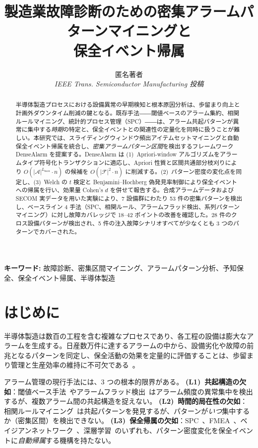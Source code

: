 \documentclass[11pt]{article}
\title{製造業故障診断のための密集アラームパターンマイニングと\\保全イベント帰属}
\author{
  匿名著者\\
  \textit{IEEE Trans. Semiconductor Manufacturing 投稿}
}
\date{}
\begin{document}
\maketitle

\begin{abstract}
半導体製造プロセスにおける設備異常の早期検知と根本原因分析は、歩留まり向上と計画外ダウンタイム削減の鍵となる。既存手法――閾値ベースのアラーム集約、相関ルールマイニング、統計的プロセス管理（SPC）――は、アラーム共起パターンが異常に集中する\emph{時期}の特定と、保全イベントとの関連性の定量化を同時に扱うことが難しい。本研究では、スライディングウィンドウ頻出アイテムセットマイニングと自動保全イベント帰属を統合し、\emph{密集アラームパターン区間}を検出するフレームワーク DenseAlarm を提案する。DenseAlarm は (1)~Apriori-window アルゴリズムをアラームタイプ符号化トランザクションに適応し、Apriori 性質と区間共通部分枝刈りにより $O(|\mathcal{A}|^{L_{\max}} \cdot n)$ の候補を $O(|\mathcal{F}|^2 \cdot n)$ に削減する。(2)~パターン密度の変化点を同定し、(3)~Welch の $t$ 検定と Benjamini--Hochberg 偽発見率制御により保全イベントへの帰属を行い、効果量 Cohen's $d$ を併せて報告する。合成アラームデータおよび SECOM 実データを用いた実験により、7 設備群にわたり 53 件の密集パターンを検出し、ベースライン 4 手法（SPC、相関ルール、アラームフラッド検出、系列パターンマイニング）に対し故障カバレッジで 18--42 ポイントの改善を確認した。28 件のクロス設備パターンが検出され、5 件の注入故障シナリオすべてが少なくとも 3 つのパターンでカバーされた。
\end{abstract}

\noindent\textbf{キーワード:} 故障診断、密集区間マイニング、アラームパターン分析、予知保全、保全イベント帰属、半導体製造

\section{はじめに}\label{sec:intro}

半導体製造は数百の工程を含む複雑なプロセスであり、各工程の設備は膨大なアラームを生成する。日産数万件に達するアラームの中から、設備劣化や故障の前兆となるパターンを同定し、保全活動の効果を定量的に評価することは、歩留まり管理と生産効率の維持に不可欠である~\citep{he2007secom,susto2015machine}。

アラーム管理の現行手法には、3 つの根本的限界がある。
\textbf{(L1)~共起構造の欠如}：閾値ベース手法~\citep{bransby1998alarm,isa2009alarm}やアラームフラッド検出~\citep{izadi2013alarm,wang2016alarm}はアラーム頻度の異常集中を検出するが、複数アラーム間の共起構造を捉えない。
\textbf{(L2)~時間的局在性の欠如}：相関ルールマイニング~\citep{agrawal1994fast,cheng2013alarm}は共起パターンを発見するが、パターンが\emph{いつ}集中するか（密集区間）を検出できない。
\textbf{(L3)~保全帰属の欠如}：SPC~\citep{montgomery2019spc}、FMEA~\citep{stamatis2003fmea}、ベイジアンネットワーク~\citep{weber2012bayesian}、深層学習~\citep{khan2018deep,li2020deep}のいずれも、パターン密度変化を保全イベントに\emph{自動帰属}する機構を持たない。
\end{document}
